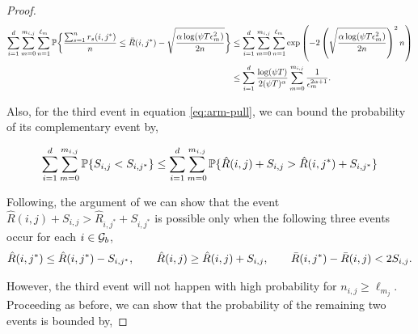 \begin{proof}
\begin{align*}
\sum_{i=1}^{d}\sum_{m=0}^{m_{i,j}}\sum_{n =1}^{\ell_{m_{}}}\mathbb{P}\bigg\lbrace \dfrac{\sum_{s=1}^{n} r_{s}(i,j^*)}{n} \leq \bar{R}(i,j^*) - \sqrt{\dfrac{\alpha\log(\psi T\epsilon_{m_{}}^2)}{2n}} \bigg\rbrace &\leq \sum_{i=1}^{d}\sum_{m=0}^{m_{i,j}}\sum_{n=1}^{\ell_{m_{}}}\exp\left(-2\left(\sqrt{\dfrac{\alpha\log(\psi T\epsilon_{m_{}}^2)}{2n}}\right)^2n_{} \right)\\
&\leq \sum_{i=1}^{d}\dfrac{\log(\psi T )}{2(\psi T)^{\alpha}}\sum_{m=0}^{m_{i,j}}\dfrac{1}{\epsilon_{m_{}}^{2\alpha +1}}.
\end{align*}


Also, for the third event in equation \ref{eq:arm-pull}, we can bound the probability of its complementary event by,

\begin{align*}
\sum_{i=1}^{d}\sum_{m=0}^{m_{i,j}}\mathbb{P}\lbrace S_{i,j} < S_{i,j^*} \rbrace &\leq \sum_{i=1}^{d}\sum_{m=0}^{m_{i,j}}\mathbb{P} \lbrace \hat{R}(i,j) + S_{i,j} > \hat{R}(i,j^*) + S_{i,j^*}\rbrace \\
\end{align*}



Following, the argument of \citet{auer2002finite} we can show that  the event $\hat{R}(i,j) + S_{i,j} > \hat{R}_{i,j^*} + S_{i,j^*}$ is possible only when the following three events occur for each $i\in\mathcal{G}_b$, 
\begin{align*}
\hat{R}(i,j^*) \leq \hat{R}(i,j^*) - S_{i,j^*}  , \hspace*{2em}  \hat{R}(i,j) \geq \hat{R}(i,j) + S_{i,j}, \hspace*{2em}  \bar{R}(i,j^*)-\bar{R}(i,j) < 2 S_{i,j} . 
\end{align*}
 
However, the third event will not happen with high probability for $n_{i,j}\geq \ell_{m_{j}}$. Proceeding as before, we can show that the probability of the remaining two events is bounded by,


\end{proof}
